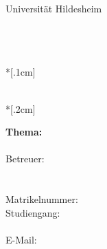 
\thispagestyle{empty}
\linespread {1.25}\selectfont %
\begin{flushright}
Universit\"at Hildesheim\\
\lehrstuhl\\
\prof\\
\end{flushright}
\begin{center}
\linespread {1.05}\selectfont %
\vfill
\LARGE{\vtyp\\*[.1cm]\parbox{0.6\textwidth}{\begin{center}\veranstaltung\end{center}}\\*[.2cm]}
\large{\textbf{Thema: \thema\\~\\}
Betreuer: \betreuer\\~\\
\semester}
\vfill
\name\\
Matrikelnummer: \matr\\
Studiengang: \studgang\\~\\
E-Mail: \href{mailto:\email}{\email}\\
\end{center}
\setcounter{page}{0}
\newpage
